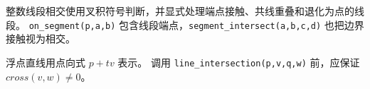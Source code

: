 整数线段相交使用叉积符号判断，并显式处理端点接触、共线重叠和退化为点的线段。
\texttt{on\_segment(p,a,b)} 包含线段端点，\texttt{segment\_intersect(a,b,c,d)} 也把边界接触视为相交。

浮点直线用点向式 \(p+t v\) 表示。
调用 \texttt{line\_intersection(p,v,q,w)} 前，应保证 \(cross(v,w)\ne0\)。
